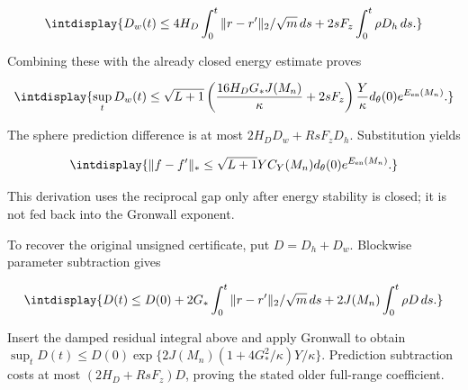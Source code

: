 \begingroup\renewcommand{\theHequation}{intdisplay.466}
\begin{equation*}
\intdisplay{
D_w(t)\le4H_D\int_0^t\|r-r'\|_2/\sqrt m\,ds
+2sF_z\int_0^t\rho D_h\,ds.
}
\end{equation*}
\endgroup


Combining these with the already closed energy estimate proves


\begingroup\renewcommand{\theHequation}{intdisplay.467}
\begin{equation*}
\intdisplay{
\sup_tD_w(t)\le\sqrt{L+1}
\left(\frac{16H_DG_*J(M_n)}\kappa+2sF_z\right)
\frac Y\kappa d_\theta(0)e^{E_{\mathrm{en}}(M_n)}.
}
\end{equation*}
\endgroup


The sphere prediction difference is at most \(2H_DD_w+RsF_zD_h\). Substitution yields


\begingroup\renewcommand{\theHequation}{intdisplay.468}
\begin{equation*}
\intdisplay{
\|f-f'\|_*\le
\sqrt{L+1}YC_Y(M_n)d_\theta(0)e^{E_{\mathrm{en}}(M_n)}.
}
\end{equation*}
\endgroup


This derivation uses the reciprocal gap only after energy stability is closed; it is not fed back into the Gronwall exponent.



To recover the original unsigned certificate, put \(D=D_h+D_w\). Blockwise parameter subtraction gives


\begingroup\renewcommand{\theHequation}{intdisplay.469}
\begin{equation*}
\intdisplay{
D(t)\le D(0)+2G_*\int_0^t\|r-r'\|_2/\sqrt m\,ds
+2J(M_n)\int_0^t\rho D\,ds.
}
\end{equation*}
\endgroup


Insert the damped residual integral above and apply Gronwall to obtain \(\sup_tD(t)\le D(0)\exp\{2J(M_n)(1+4G_*^2/\kappa)Y/\kappa\}\). Prediction subtraction costs at most \((2H_D+RsF_z)D\), proving the stated older full-range coefficient.


